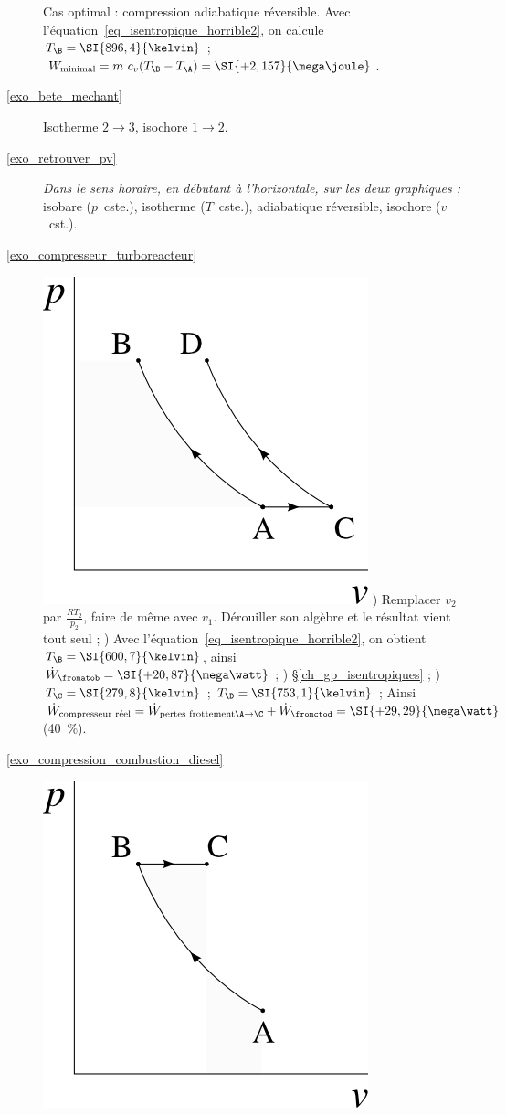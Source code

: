 \begin{description}
						\tab Cas optimal : compression adiabatique réversible. Avec l’équation~\ref{eq_isentropique_horrible2}, on calcule $T_\B = \SI{896,4}{\kelvin}$ ; $W_\text{minimal} = m \ c_v (T_\B - T_\A) = \SI{+2,157}{\mega\joule}$.
	\item [\ref{exo_bete_mechant}]
						\tab Isotherme $2 \to 3$, isochore $1 \to 2$.
	\item [\ref{exo_retrouver_pv}]
						\tab \textit{Dans le sens horaire, en débutant à l’horizontale, sur les deux graphiques :} isobare ($p$~cste.), isotherme ($T$~cste.), adiabatique réversible, isochore ($v$~cst.).
	\item [\ref{exo_compresseur_turboreacteur}]
						\includegraphics[width=\solutiondiagramwidth]{images/exo_sol_pv_turbojet_compressor.png}
						) Remplacer $v_2$ par $\frac{R T_2}{p_2}$, faire de même avec $v_1$. Dérouiller son algèbre et le résultat vient tout seul ;
						) Avec l’équation~\ref{eq_isentropique_horrible2}, on obtient $T_\B = \SI{600,7}{\kelvin}$, ainsi $\dot{W}_{\fromatob} = \SI{+20,87}{\mega\watt}$ ;
						) \S\ref{ch_gp_isentropiques} ;
						) $T_\C = \SI{279,8}{\kelvin}$ ; $T_\D = \SI{753,1}{\kelvin}$ ; Ainsi $\dot{W}_\text{compresseur réel} = \dot{W}_{\text{pertes frottement} \A \to \C} + \dot{W}_\fromctod = \SI{+29,29}{\mega\watt}$ (\SI{+40}{\percent}).
	\item [\ref{exo_compression_combustion_diesel}]
						\includegraphics[width=\solutiondiagramwidth]{images/exo_sol_pv_diesel.png}

\end{description}
